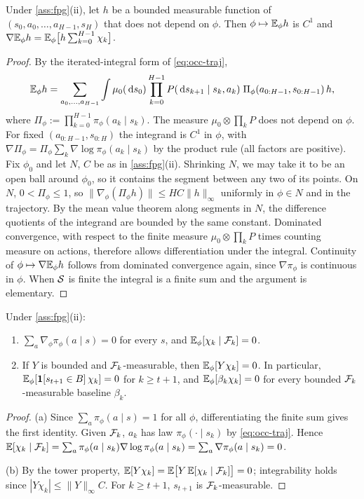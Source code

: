 \begin{lemma}\label{lem:fpg-lr}
Under \cref{ass:fpg}(ii), let $h$ be a bounded measurable function of $(s_0,a_0,\dots,a_{H-1},s_H)$ that does not depend on $\phi$.
Then $\phi\mapsto\mathbb{E}_\phi h$ is $C^1$ and $\nabla\mathbb{E}_\phi h=\mathbb{E}_\phi\big[h\sum_{k=0}^{H-1}\chi_k\big]$.
\end{lemma}
\begin{proof}
By the iterated-integral form of \eqref{eq:occ-traj},
\[
\mathbb{E}_\phi h=\sum_{a_0,\dots,a_{H-1}}\int\mu_0(\,\mathrm{d} s_0)\prod_{k=0}^{H-1}P(\,\mathrm{d} s_{k+1}\mid s_k,a_k)\;\Pi_\phi(a_{0:H-1},s_{0:H-1})\,h,
\]
where $\Pi_\phi:=\prod_{k=0}^{H-1}\pi_\phi(a_k\mid s_k)$.
The measure $\mu_0\otimes\prod_kP$ does not depend on $\phi$.
For fixed $(a_{0:H-1},s_{0:H})$ the integrand is $C^1$ in $\phi$, with
$\nabla\Pi_\phi=\Pi_\phi\sum_k\nabla\log\pi_\phi(a_k\mid s_k)$ by the product rule (all factors are positive).
Fix $\phi_0$ and let $N$, $C$ be as in \cref{ass:fpg}(ii). Shrinking $N$, we may take it to be an open ball around $\phi_0$, so it contains the segment between any two of its points.
On $N$, $0<\Pi_\phi\le1$, so $\|\nabla_\phi(\Pi_\phi h)\|\le HC\|h\|_\infty$ uniformly in $\phi\in N$ and in the trajectory.
By the mean value theorem along segments in $N$, the difference quotients of the integrand are bounded by the same constant.
Dominated convergence, with respect to the finite measure $\mu_0\otimes\prod_kP$ times counting measure on actions, therefore allows differentiation under the integral.
Continuity of $\phi\mapsto\nabla\mathbb{E}_\phi h$ follows from dominated convergence again, since $\nabla\pi_\phi$ is continuous in $\phi$.
When $\mathcal{S}$ is finite the integral is a finite sum and the argument is elementary.
\end{proof}

\begin{lemma}\label{lem:fpg-causal}
Under \cref{ass:fpg}(ii):
\begin{enumerate}[nosep,label=(\alph*)]
\item $\sum_a\nabla_\phi\pi_\phi(a\mid s)=0$ for every $s$, and $\mathbb{E}_\phi[\chi_k\mid\mathcal{F}_k]=0$.
\item If $Y$ is bounded and $\mathcal{F}_k$-measurable, then $\mathbb{E}_\phi[Y\chi_k]=0$.
  In particular, $\mathbb{E}_\phi[\mathbf{1}[s_{t+1}\in B]\,\chi_k]=0$ for $k\ge t+1$, and $\mathbb{E}_\phi[\beta_k\chi_k]=0$ for every bounded $\mathcal{F}_k$-measurable baseline $\beta_k$.
\end{enumerate}
\end{lemma}
\begin{proof}
(a) Since $\sum_a\pi_\phi(a\mid s)=1$ for all $\phi$, differentiating the finite sum gives the first identity.
Given $\mathcal{F}_k$, $a_k$ has law $\pi_\phi(\cdot\mid s_k)$ by \eqref{eq:occ-traj}.
Hence $\mathbb{E}[\chi_k\mid\mathcal{F}_k]=\sum_a\pi_\phi(a\mid s_k)\nabla\log\pi_\phi(a\mid s_k)=\sum_a\nabla\pi_\phi(a\mid s_k)=0$.

(b) By the tower property, $\mathbb{E}[Y\chi_k]=\mathbb{E}\big[Y\,\mathbb{E}[\chi_k\mid\mathcal{F}_k]\big]=0$; integrability holds since $|Y\chi_k|\le\|Y\|_\infty C$.
For $k\ge t+1$, $s_{t+1}$ is $\mathcal{F}_k$-measurable.
\end{proof}

